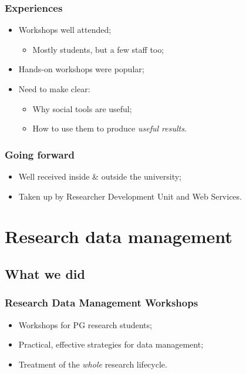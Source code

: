 \documentclass{beamer}
\begin{document}
\begin{frame}
  \frametitle{Experiences}
  
  \begin{itemize}
    \item Workshops well attended;
      \begin{itemize}
        \item Mostly students, but a few staff too;
      \end{itemize}
    \item Hands-on workshops were popular;
    \item Need to make clear:
      \begin{itemize}
        \item Why social tools are useful;
        \item How to use them to produce \emph{useful results}.
      \end{itemize}
  \end{itemize}
\end{frame}

\begin{frame}
  \frametitle{Going forward}
  
  \begin{itemize}
    \item Well received inside \& outside the university;
    \item Taken up by Researcher Development Unit and Web Services.
  \end{itemize}
\end{frame}

\section{Research data management}

\subsection{What we did}

\begin{frame}
  \frametitle{Research Data Management Workshops}
 
  \begin{itemize}
    \item Workshops for PG research students;
    \item Practical, effective strategies for data management;
    \item Treatment of the \emph{whole} research lifecycle.
  \end{itemize}
\end{frame}
\end{document}
